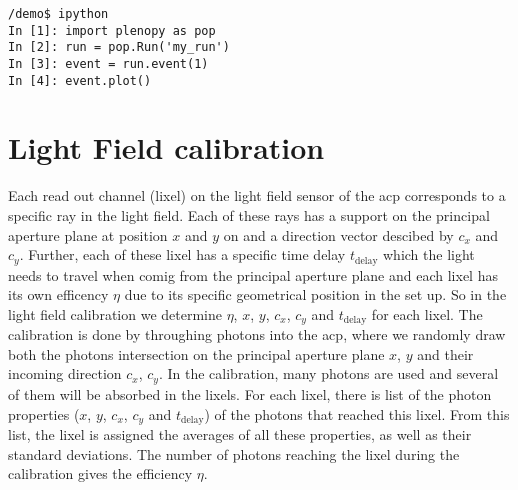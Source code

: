 \begin{minipage}{\linewidth}%
\begin{lstlisting}[style=MctBash]
/demo$ ipython
In [1]: import plenopy as pop
In [2]: run = pop.Run('my_run')
In [3]: event = run.event(1)
In [4]: event.plot()
\end{lstlisting}
\end{minipage}%
%
%
\section{Light Field calibration}
%
Each read out channel (lixel) on the light field sensor of the \ac{acp} corresponds to a specific ray in the light field. 
%
Each of these rays has a support on the principal aperture plane at position $x$ and $y$ on and a direction vector descibed by $c_x$ and $c_y$.
%
Further, each of these lixel has a specific time delay $t_\text{delay}$ which the light needs to travel when comig from the principal aperture plane and each lixel has its own efficency $\eta$ due to its specific geometrical position in the set up.
%
So in the light field calibration we determine $\eta$, $x$, $y$, $c_x$, $c_y$ and $t_\text{delay}$ for each lixel.
%
The calibration is done by throughing photons into the \ac{acp}, where we randomly draw both the photons intersection on the principal aperture plane $x$, $y$ and their incoming direction $c_x$, $c_y$.
%
In the calibration, many photons are used and several of them will be absorbed in the lixels.
%
For each lixel, there is list of the photon properties ($x$, $y$, $c_x$, $c_y$ and $t_\text{delay}$) of the photons that reached this lixel.
%
From this list, the lixel is assigned the averages of all these properties, as well as their standard deviations.
%
The number of photons reaching the lixel during the calibration gives the efficiency $\eta$.
%
